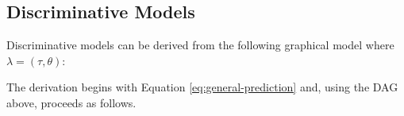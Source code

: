 \documentclass{article}
\begin{document}
\subsection{Discriminative Models}
Discriminative models can be derived from the following graphical model where $\lambda = \left( \tau, \theta \right)$:\newline
\begin{center}
\end{center}
The derivation begins with Equation \ref{eq:general-prediction} and, using the DAG above, proceeds as follows.
\end{document}
